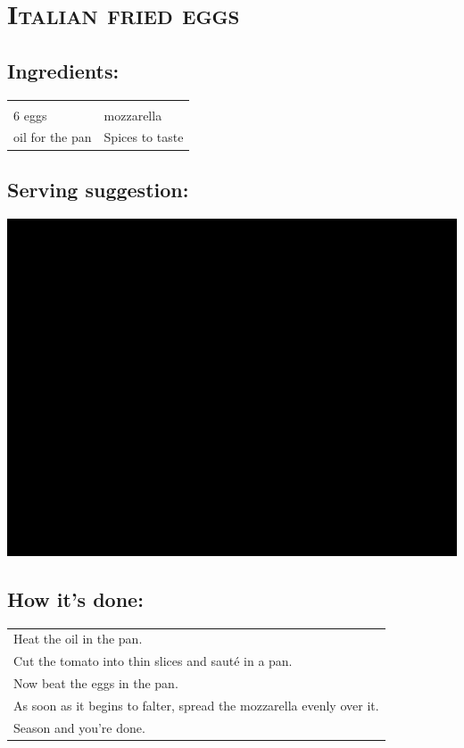 \section{\textsc{Italian fried eggs}}

\subsection*{Ingredients:}

\begin{tabular}{p{7.5cm} p{7.5cm}}
	& \\
	6 eggs & mozzarella \\
	oil for the pan & Spices to taste
\end{tabular}

\subsection*{Serving suggestion:}

\includegraphics[width=\textwidth]{img/ph.jpg} \cite{itaspiegelei}

\subsection*{How it's done:}

\begin{tabular}{p{15cm}}
	\\
  Heat the oil in the pan.\\
  Cut the tomato into thin slices and sauté in a pan.\\
  Now beat the eggs in the pan.\\
  As soon as it begins to falter, spread the mozzarella evenly over it.\\
  Season and you're done.
\end{tabular}
